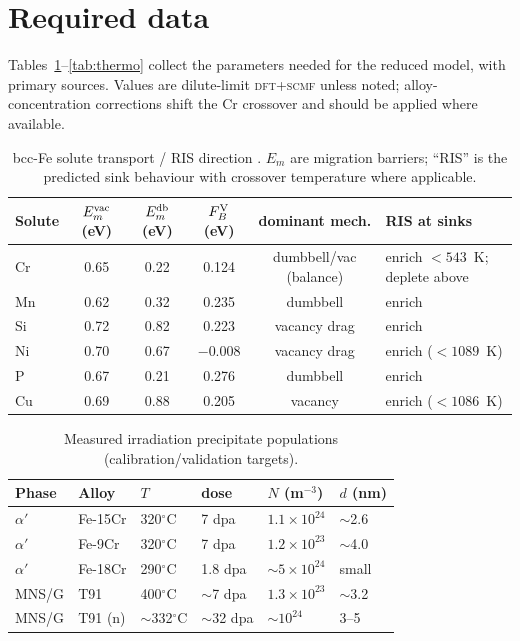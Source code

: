 \documentclass[11pt]{article}
\begin{document}
\section{Required data}
\label{sec:data}
Tables~\ref{tab:transport}--\ref{tab:thermo} collect the parameters needed for
the reduced model, with primary sources. Values are dilute-limit
\textsc{dft}+\textsc{scmf} unless noted; alloy-concentration corrections shift
the Cr crossover and should be applied where available.

\begin{table}[h]
\centering\small
\caption{bcc-Fe solute transport / RIS direction \citep{Messina2014,Messina2020}.
$E_m$ are migration barriers; ``RIS'' is the predicted sink behaviour with
crossover temperature where applicable.}
\label{tab:transport}
\begin{tabular}{lccccl}
\toprule
Solute & $E_m^{\rm vac}$ (eV) & $E_m^{\rm db}$ (eV) & $F_B^{\rm V}$ (eV) &
  dominant mech. & RIS at sinks \\
\midrule
Cr & 0.65 & 0.22 & 0.124 & dumbbell/vac (balance) & enrich $<\!543$~K; deplete above \\
Mn & 0.62 & 0.32 & 0.235 & dumbbell & enrich \\
Si & 0.72 & 0.82 & 0.223 & vacancy drag & enrich \\
Ni & 0.70 & 0.67 & $-0.008$ & vacancy drag & enrich ($<\!1089$~K) \\
P  & 0.67 & 0.21 & 0.276 & dumbbell & enrich \\
Cu & 0.69 & 0.88 & 0.205 & vacancy & enrich ($<\!1086$~K) \\
\bottomrule
\end{tabular}
\end{table}

\begin{table}[h]
\centering\small
\caption{Measured irradiation precipitate populations (calibration/validation
targets).}
\label{tab:ppt}
\begin{tabular}{llllll}
\toprule
Phase & Alloy & $T$ & dose & $N$ (m$^{-3}$) & $d$ (nm) \\
\midrule
$\alpha'$ & Fe-15Cr & 320$^\circ$C & 7 dpa & $1.1\times10^{24}$ & $\sim$2.6 \citep{Reese2018}\\
$\alpha'$ & Fe-9Cr  & 320$^\circ$C & 7 dpa & $1.2\times10^{23}$ & $\sim$4.0 \citep{Reese2018}\\
$\alpha'$ & Fe-18Cr & 290$^\circ$C & 1.8 dpa & $\sim5\times10^{24}$ & small \citep{Bachhav2014}\\
MNS/G    & T91     & 400$^\circ$C & $\sim$7 dpa & $1.3\times10^{23}$ & $\sim$3.2 \citep{Ke2018mns}\\
MNS/G    & T91 (n) & $\sim$332$^\circ$C & $\sim$32 dpa & $\sim10^{24}$ & 3--5 \citep{Ke2018fm}\\
\bottomrule
\end{tabular}
\end{table}
\end{document}
